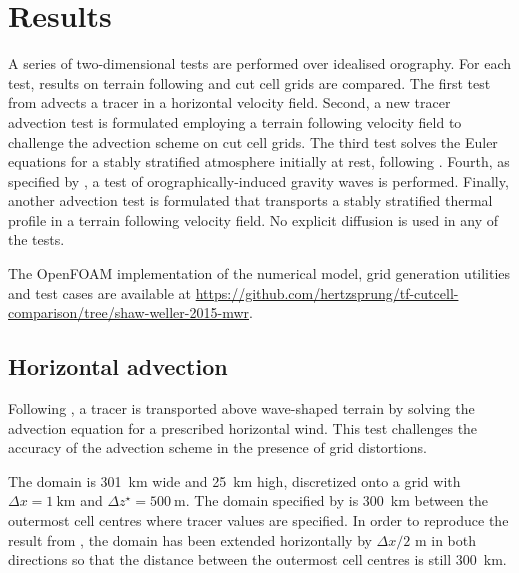 \documentclass{ametsoc}
\begin{document}


\section{Results}
\label{sec:results}

A series of two-dimensional tests are performed over idealised orography.  For each test, results on terrain following and cut cell grids are compared.  The first test from \citet{schaer2002} advects a tracer in a horizontal velocity field.  Second, a new tracer advection test is formulated employing a terrain following velocity field to challenge the advection scheme on cut cell grids.  The third test solves the Euler equations for a stably stratified atmosphere initially at rest, following \citet{klemp2011}.  Fourth, as specified by \citet{schaer2002}, a test of orographically-induced gravity waves is performed.  Finally, another advection test is formulated that transports a stably stratified thermal profile in a terrain following velocity field.
No explicit diffusion is used in any of the tests.

The OpenFOAM implementation of the numerical model, grid generation utilities and test cases are available at \url{https://github.com/hertzsprung/tf-cutcell-comparison/tree/shaw-weller-2015-mwr}.


\subsection{Horizontal advection}

Following \citet{schaer2002}, a tracer is transported above wave-shaped terrain by solving the advection equation for a prescribed horizontal wind.  This test challenges the accuracy of the advection scheme in the presence of grid distortions.

The domain is \SI{301}{\kilo\meter} wide and \SI{25}{\kilo\meter} high, discretized onto a grid with \(\Delta x = \SI{1}{\kilo\meter}\) and \(\Delta z^\star = \SI{500}{\meter}\).  The domain specified by \citet{schaer2002} is \SI{300}{\kilo\meter} between the outermost cell centres where tracer values are specified.  In order to reproduce the result from \citet{schaer2002}, the domain has been extended horizontally by \(\Delta x/2\) \si{\meter} in both directions so that the distance between the outermost cell centres is still \SI{300}{\kilo\meter}.
\end{document}
